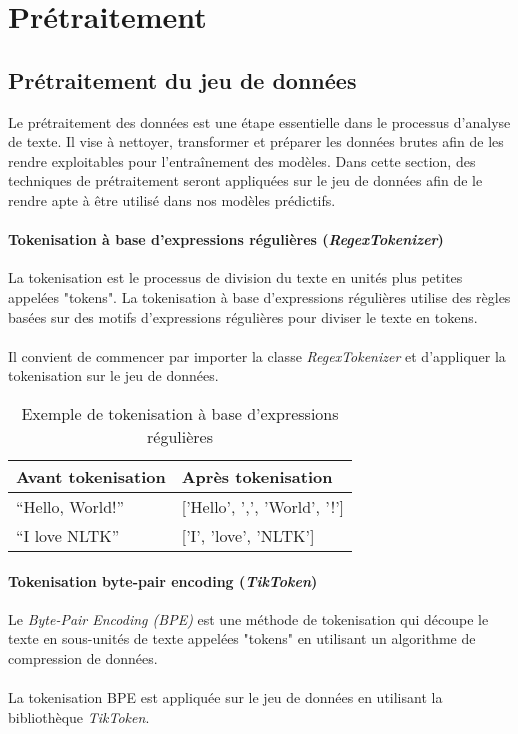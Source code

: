 \chapter{Prétraitement}

\section{Prétraitement du jeu de données}

Le prétraitement des données est une étape essentielle dans le processus d'analyse de texte. Il vise à nettoyer, transformer et préparer les données brutes afin de les rendre exploitables pour l'entraînement des modèles. Dans cette section, des techniques de prétraitement seront appliquées sur le jeu de données afin de le rendre apte à être utilisé dans nos modèles prédictifs.

\subsubsection{Tokenisation à base d'expressions régulières (\textit{RegexTokenizer})}

La tokenisation est le processus de division du texte en unités plus petites appelées "tokens". La tokenisation à base d’expressions régulières utilise des règles basées sur des motifs d'expressions régulières pour diviser le texte en tokens. \\
\\
Il convient de commencer par importer la classe \textit{RegexTokenizer} et d'appliquer la tokenisation sur le jeu de données.

\begin{table}[h]
\centering
\begin{tabular}{|l|l|}
\hline
\textbf{Avant tokenisation} & \textbf{Après tokenisation} \\ \hline
``Hello, World!'' & ['Hello', ',', 'World', '!'] \\ \hline
``I love NLTK'' & ['I', 'love', 'NLTK'] \\ \hline
\end{tabular}
\caption{Exemple de tokenisation à base d'expressions régulières}
\end{table}

\subsubsection{Tokenisation byte-pair encoding (\textit{TikToken})}

Le \textit{Byte-Pair Encoding (BPE)} est une méthode de tokenisation qui découpe le texte en sous-unités de texte appelées "tokens" en utilisant un algorithme de compression de données.
\\
\\
La tokenisation BPE est appliquée sur le jeu de données en utilisant la bibliothèque \textit{TikToken}.

